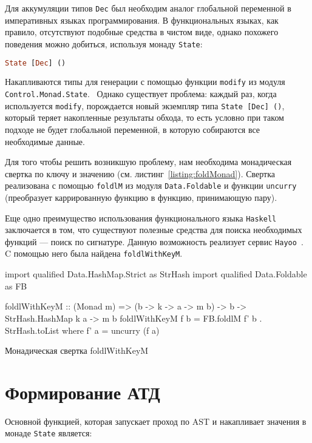 Для аккумуляции типов \lstinline{Dec} был необходим аналог глобальной переменной в императивных языках программирования. В функциональных языках, как правило, отсутствуют подобные средства в чистом виде, однако похожего поведения можно добиться, используя монаду \lstinline{State}:

\begin{lstlisting}[language=Haskell]
State [Dec] ()
\end{lstlisting}

Накапливаются типы для генерации с помощью функции \lstinline{modify} из модуля \lstinline{Control.Monad.State}.~\cite{stateM} Однако существует проблема: каждый раз, когда используется \lstinline{modify}, порождается новый экземпляр типа \lstinline{State [Dec] ()}, который теряет накопленные результаты обхода, то есть условно при таком подходе не будет глобальной переменной, в которую собираются все необходимые данные. 

Для того чтобы решить возникшую проблему, нам необходима монадическая свертка по ключу и значению (см. листинг~\ref{listing:foldMonad}). Свертка реализована с помощью \lstinline{foldlM} из модуля \lstinline{Data.Foldable} и функции \lstinline{uncurry} (преобразует каррированную функцию в функцию, принимающую пару).

Еще одно преимущество использования функционального языка \lstinline{Haskell} заключается в том, что существуют полезные средства для поиска необходимых функций --- поиск по сигнатуре. Данную возможность реализует сервис \lstinline{Hayoo}~\cite{hayoo}. C помощью него была найдена \lstinline{foldlWithKeyM}. 

\begin{ListingEnv}[t]
\begin{Verb}
import qualified Data.HashMap.Strict as StrHash
import qualified Data.Foldable    as FB

foldlWithKeyM :: (Monad m) => (b -> k -> a -> m b) -> b ->
                                       StrHash.HashMap k a -> m b
foldlWithKeyM f b = FB.foldlM f' b . StrHash.toList
  where f' a = uncurry (f a)
\end{Verb}
\caption{Монадическая свертка foldlWithKeyM}
\label{listing:foldMonad}
\end{ListingEnv} 

\section{Формирование АТД}

Основной функцией, которая запускает проход по AST и накапливает значения в монаде \lstinline{State} является: 


